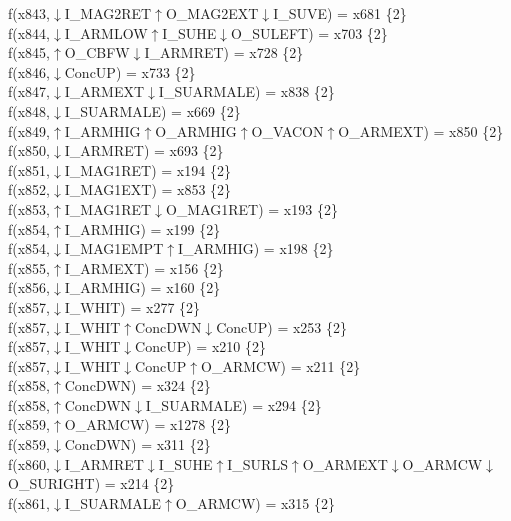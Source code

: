f(x843,$\downarrow$I\_MAG2RET$\uparrow$O\_MAG2EXT$\downarrow$I\_SUVE) = x681 \{2\} \\  
f(x844,$\downarrow$I\_ARMLOW$\uparrow$I\_SUHE$\downarrow$O\_SULEFT) = x703 \{2\} \\  
f(x845,$\uparrow$O\_CBFW$\downarrow$I\_ARMRET) = x728 \{2\} \\  
f(x846,$\downarrow$ConcUP) = x733 \{2\} \\  
f(x847,$\downarrow$I\_ARMEXT$\downarrow$I\_SUARMALE) = x838 \{2\} \\  
f(x848,$\downarrow$I\_SUARMALE) = x669 \{2\} \\  
f(x849,$\uparrow$I\_ARMHIG$\uparrow$O\_ARMHIG$\uparrow$O\_VACON$\uparrow$O\_ARMEXT) = x850 \{2\} \\  
f(x850,$\downarrow$I\_ARMRET) = x693 \{2\} \\  
f(x851,$\downarrow$I\_MAG1RET) = x194 \{2\} \\  
f(x852,$\downarrow$I\_MAG1EXT) = x853 \{2\} \\  
f(x853,$\uparrow$I\_MAG1RET$\downarrow$O\_MAG1RET) = x193 \{2\} \\  
f(x854,$\uparrow$I\_ARMHIG) = x199 \{2\} \\  
f(x854,$\downarrow$I\_MAG1EMPT$\uparrow$I\_ARMHIG) = x198 \{2\} \\  
f(x855,$\uparrow$I\_ARMEXT) = x156 \{2\} \\  
f(x856,$\downarrow$I\_ARMHIG) = x160 \{2\} \\  
f(x857,$\downarrow$I\_WHIT) = x277 \{2\} \\  
f(x857,$\downarrow$I\_WHIT$\uparrow$ConcDWN$\downarrow$ConcUP) = x253 \{2\} \\  
f(x857,$\downarrow$I\_WHIT$\downarrow$ConcUP) = x210 \{2\} \\  
f(x857,$\downarrow$I\_WHIT$\downarrow$ConcUP$\uparrow$O\_ARMCW) = x211 \{2\} \\  
f(x858,$\uparrow$ConcDWN) = x324 \{2\} \\  
f(x858,$\uparrow$ConcDWN$\downarrow$I\_SUARMALE) = x294 \{2\} \\  
f(x859,$\uparrow$O\_ARMCW) = x1278 \{2\} \\  
f(x859,$\downarrow$ConcDWN) = x311 \{2\} \\  
f(x860,$\downarrow$I\_ARMRET$\downarrow$I\_SUHE$\uparrow$I\_SURLS$\uparrow$O\_ARMEXT$\downarrow$O\_ARMCW$\downarrow$O\_SURIGHT) = x214 \{2\} \\  
f(x861,$\downarrow$I\_SUARMALE$\uparrow$O\_ARMCW) = x315 \{2\} \\  
